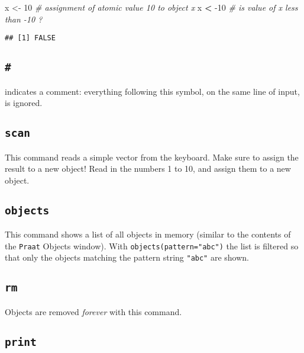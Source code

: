 \documentclass[]{book}
\newenvironment{Shaded}{\begin{snugshade}}{\end{snugshade}}
\newcommand{\CommentTok}[1]{\textcolor[rgb]{0.56,0.35,0.01}{\textit{#1}}}
\newcommand{\DecValTok}[1]{\textcolor[rgb]{0.00,0.00,0.81}{#1}}
\newcommand{\NormalTok}[1]{#1}
\newcommand{\OperatorTok}[1]{\textcolor[rgb]{0.81,0.36,0.00}{\textbf{#1}}}
\newcommand{\StringTok}[1]{\textcolor[rgb]{0.31,0.60,0.02}{#1}}
\begin{document}
\begin{Shaded}
\begin{Highlighting}[]
\NormalTok{x <-}\StringTok{ }\DecValTok{10} \CommentTok{# assignment of atomic value 10 to object x}
\NormalTok{x }\OperatorTok{<}\StringTok{ }\DecValTok{-10} \CommentTok{# is value of x less than -10 ?}
\end{Highlighting}
\end{Shaded}

\begin{verbatim}
## [1] FALSE
\end{verbatim}

\hypertarget{section-1}{%
\subsection{\texorpdfstring{\texttt{\#}}{\#}}\label{section-1}}

indicates a comment: everything following this symbol, on the same
line of input, is ignored.

\hypertarget{scan}{%
\subsection{\texorpdfstring{\texttt{scan}}{scan}}\label{scan}}

This command reads a simple vector from the keyboard. Make sure to
assign the result to a new object! Read in the numbers 1 to 10, and
assign them to a new object.

\hypertarget{objects}{%
\subsection{\texorpdfstring{\texttt{objects}}{objects}}\label{objects}}

This command shows a list of all objects in memory (similar to the
contents of the \texttt{Praat} Objects window). With \texttt{objects(pattern="abc")} the list is filtered so that only the objects matching the pattern string \texttt{"abc"} are shown.

\hypertarget{rm}{%
\subsection{\texorpdfstring{\texttt{rm}}{rm}}\label{rm}}

Objects are removed \emph{forever} with this command.

\hypertarget{print}{%
\subsection{\texorpdfstring{\texttt{print}}{print}}\label{print}}
\end{document}
